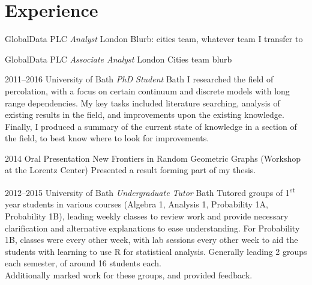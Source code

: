 \documentclass[print, oneside]{friggeri-cv} %
\begin{document}
\section{Experience}


\begin{entrylist}

{GlobalData PLC {\normalfont \emph{Analyst}}}
{London}
{Blurb: cities team, whatever team I transfer to}

{GlobalData PLC {\normalfont \emph{Associate Analyst}}}
{London}
{Cities team blurb}


\entry
{2011--2016}
{University of Bath {\normalfont \emph{PhD Student}}}
{Bath}
{I researched the field of percolation, with a focus on certain continuum and discrete models with long range dependencies. My key tasks included literature searching, analysis of existing results in the field, and improvements upon the existing knowledge. Finally, I produced a summary of the current state of knowledge in a section of the field, to best know where to look for improvements.}

\entry
{2014}
{Oral Presentation}
{New Frontiers in Random Geometric Graphs (Workshop at the Lorentz Center)}
{Presented a result forming part of my thesis.}




\entry
{2012--2015}
{University of Bath {\normalfont \emph{Undergraduate Tutor}}}
{Bath}
{Tutored groups of 1\textsuperscript{st} year students in various courses (Algebra 1, Analysis 1, Probability 1A, Probability 1B), leading weekly classes to review work and provide necessary clarification and alternative explanations to ease understanding. For Probability 1B, classes were every other week, with lab sessions every other week to aid the students with learning to use R for statistical analysis. Generally leading 2 groups each semester, of around 16 students each.\\
Additionally marked work for these groups, and provided feedback.}


\end{entrylist}
\end{document}
